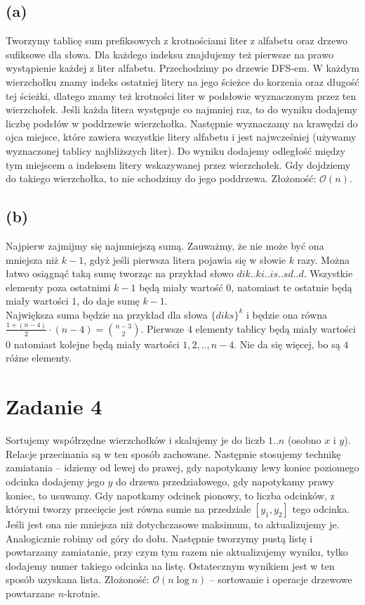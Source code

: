 \documentclass[12pt, a4paper]{article}
\newcommand{\MCALO}{\mathcal{O}}
\begin{document}
\subsection*{(a)}
Tworzymy tablicę sum prefiksowych z krotnościami liter z alfabetu oraz drzewo
sufiksowe dla słowa. Dla każdego indeksu znajdujemy też pierwsze na prawo
wystąpienie każdej z liter alfabetu. Przechodzimy po drzewie DFS-em. W każdym
wierzchołku znamy indeks ostatniej litery na jego ścieżce do korzenia oraz
długość tej ścieżki, dlatego znamy też krotności liter w podsłowie wyznaczonym
przez ten wierzchołek. Jeśli każda litera występuje co najmniej raz, to do
wyniku dodajemy liczbę podsłów w poddrzewie wierzchołka. Następnie wyznaczamy
na krawędzi do ojca miejsce, które zawiera wszystkie litery alfabetu i jest
najwcześniej (używamy wyznaczonej tablicy najbliższych liter). Do wyniku
dodajemy odległość między tym miejscem a indeksem litery wskazywanej przez
wierzchołek. Gdy dojdziemy do takiego wierzchołka, to nie schodzimy do jego
poddrzewa.
Złożoność: $\MCALO(n)$.

\subsection*{{(b)}}
Najpierw zajmijmy się najmniejszą sumą. Zauważmy, że nie może być ona mniejsza
niż $k-1$, gdyż jeśli pierwsza litera pojawia się w słowie $k$ razy. Można
łatwo osiągnąć taką sumę tworząc na przykład słowo $dik..ki..is..sd..d$.
Wszystkie elementy poza ostatnimi $k-1$ będą miały wartość $0$, natomiast te
ostatnie będą miały wartości $1$, do daje sumę $k-1$.\\ Największa suma będzie
na przykład dla słowa $\{diks\}^{k}$ i będzie ona równa $\frac{1 + (n-4)}{2}
\cdot (n-4) = \binom{n-3}{2}$. Pierwsze $4$ elementy tablicy będą miały
wartości $0$ natomiast kolejne będą miały wartości $1,2,..,n-4$. Nie da się więcej, bo
są $4$ różne elementy.

\section*{Zadanie 4}
Sortujemy współrzędne wierzchołków i skalujemy je do liczb $1..n$ (osobno $x$
i $y$). Relacje przecinania są w ten sposób zachowane. Następnie stosujemy
technikę zamiatania -- idziemy od lewej do prawej, gdy napotykamy lewy koniec
poziomego odcinka dodajemy jego $y$ do drzewa przedziałowego, gdy napotykamy
prawy koniec, to usuwamy. Gdy napotkamy odcinek pionowy, to liczba odcinków,
z którymi tworzy przecięcie jest równa sumie na przedziale $[y_1,y_2]$ tego
odcinka. Jeśli jest ona nie mniejsza niż dotychczasowe maksimum, to
aktualizujemy je. Analogicznie robimy od góry do dołu. Następnie tworzymy pustą
listę i powtarzamy zamiatanie, przy czym tym razem nie aktualizujemy wyniku,
tylko dodajemy numer takiego odcinka na listę. Ostatecznym wynikiem jest w ten
sposób uzyskana lista. Złożoność: $\MCALO(n\log{n})$ -- sortowanie i operacje
drzewowe powtarzane $n$-krotnie.
\end{document}
